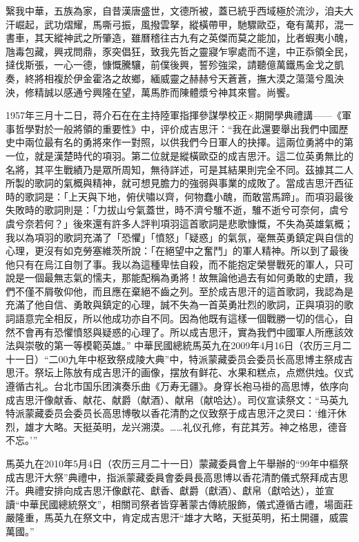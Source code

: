 繄我中華，五族為家，自昔漢唐盛世，文德所被，蓋已統乎西域極於流沙，洎夫大汗崛起，武功熠耀，馬嘶弓振，風撥雲拏，縱橫帶甲，馳驟歐亞，奄有萬邦，混一書車，其天縱神武之所肇造，雖曆稽往古九有之英傑而莫之能加，比者蝦夷小醜，虺毒包藏，興戎問鼎，豕突倡狂，致我先哲之靈寢乍寧處而不遑，中正忝領全民，撻伐斯張，一心一德，慷慨騰驤，前僕後興，誓殄強梁，請聽億萬鐵馬金戈之凱奏，終將相複於伊金霍洛之故鄉，緬威靈之赫赫兮天蒼蒼，撫大漠之蕩蕩兮風泱泱，修精誠以感通兮興隆在望，萬馬胙而陳體漿兮神其來嘗。尚饗。

1957年三月十二日，蒋介石在在主持陸軍指揮參謀學校正×期開學典禮講——《軍事哲學對於一般將領的重要性》中，评价成吉思汗：“我在此還要舉出我們中國歷史中兩位最有名的勇將來作一對照，以供我們今日軍人的抉擇。這兩位勇將中的第一位，就是漢楚時代的項羽。第二位就是縱橫歐亞的成吉思汗。這二位英勇無比的名將，其平生戰績乃是眾所周知，無待詳述，可是其結果則完全不同。茲據其二人所製的歌詞的氣概與精神，就可想見膽力的強弱與事業的成敗了。當成吉思汗西征時的歌詞是：「上天與下地，俯伏嘯以齊，何物蠢小醜，而敢當馬蹄」。而項羽最後失敗時的歌詞則是：「力拔山兮氣蓋世，時不濟兮騅不逝，騅不逝兮可奈何，虞兮虞兮奈若何？」後來還有許多人評判項羽這首歌詞是悲歌慷慨，不失為英雄氣概；我以為項羽的歌詞充滿了「恐懼」「憤怒」「疑惑」的氣氛，毫無英勇鎮定與自信的心理，更沒有如克勞塞維茨所說：「在絕望中之奮鬥」的軍人精神。所以到了最後他只有在烏江自刎了事。我以為這種卑怯自殺，而不能抱定榮譽戰死的軍人，只可說是一個最無志氣的懦夫，那能配稱為勇將！故無論他過去有如何勇敢的史蹟，我們不僅不屑敬仰他，而且應在棄絕不齒之列。至於成吉思汗的這首歌詞，我認為是充滿了他自信、勇敢與鎮定的心理，誠不失為一首英勇壯烈的歌詞，正與項羽的歌詞語意完全相反，所以他成功亦自不同。因為他既有這樣一個戰勝一切的信心，自然不會再有恐懼憤怒與疑惑的心理了。所以成吉思汗，實為我們中國軍人所應該效法與崇敬的第一等模範英雄。”
中華民國總統馬英九在2009年4月16日（农历三月二十一日）“二00九年中枢致祭成陵大典”中，特派蒙藏委员会委员长高思博主祭成吉思汗。祭坛上陈放有成吉思汗的画像，摆放有鲜花、水果和糕点，点燃供烛。仪式遵循古礼。台北市国乐团演奏乐曲《万寿无疆》。身穿长袍马褂的高思博，依序向成吉思汗像献香、献花、献爵（献酒）、献帛（献哈达）。司仪宣读祭文：“马英九特派蒙藏委员会委员长高思博敬以香花清酌之仪致祭于成吉思汗之灵曰：‘维汗休烈，雄才大略。天挺英明，龙兴溯漠。……礼仪孔修，有芘其芳。神之格思，德音不忘。’”

馬英九在2010年5月4日（农历三月二十一日）蒙藏委員會上午舉辦的“99年中樞祭成吉思汗大祭”典禮中，指派蒙藏委員會委員長高思博以香花清酌儀式祭拜成吉思汗。典禮安排向成吉思汗像獻花、獻香、獻爵（獻酒）、獻帛（獻哈达），並宣讀“中華民國總統祭文”，相關司祭者皆穿著蒙古傳統服飾，儀式遵循古禮，場面莊嚴隆重，馬英九在祭文中，肯定成吉思汗“雄才大略，天挺英明，拓土開疆，威震萬國。”

